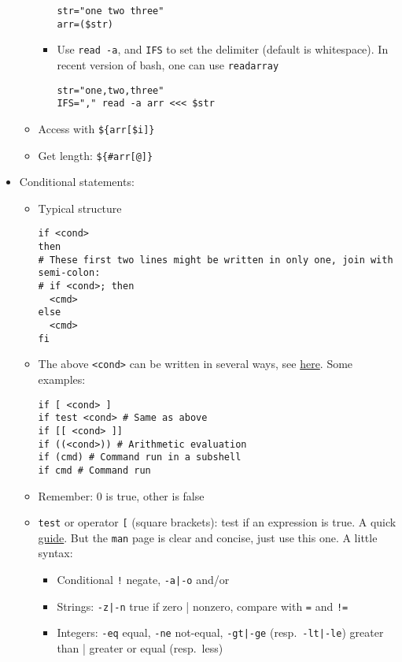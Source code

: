 \documentclass[a4paper,12pt,%
              final%
              ]{article}
\begin{document}
\begin{itemize}
\begin{itemize}
\begin{itemize}
\begin{verbatim}
str="one two three"
arr=($str)
\end{verbatim}
          \item Use \verb|read -a|, and \verb|IFS| to set the delimiter (default is whitespace). In recent version of bash, one can use \verb|readarray|
\begin{verbatim}
str="one,two,three"
IFS="," read -a arr <<< $str
\end{verbatim}
        \end{itemize}
      \item Access with \verb|${arr[$i]}|
      \item Get length: \verb|${#arr[@]}|
    \end{itemize}
  \item Conditional statements:
    \begin{itemize}
      \item Typical structure
\begin{verbatim}
if <cond>
then
# These first two lines might be written in only one, join with semi-colon:
# if <cond>; then
  <cmd>
else
  <cmd>
fi
\end{verbatim}
      \item The above \verb|<cond>| can be written in several ways, see \href{https://unix.stackexchange.com/questions/306111/what-is-the-difference-between-the-bash-operators-vs-vs-vs}{here}. Some examples:
\begin{verbatim}
if [ <cond> ]
if test <cond> # Same as above
if [[ <cond> ]]
if ((<cond>)) # Arithmetic evaluation
if (cmd) # Command run in a subshell
if cmd # Command run
\end{verbatim}
      \item Remember: 0 is true, other is false
      \item \texttt{test} or operator \verb|[| (square brackets): test if an expression is true. A quick \href{https://www.computerhope.com/unix/test.htm}{guide}. But the \texttt{man} page is clear and concise, just use this one. A little syntax:
        \begin{itemize}
          \item Conditional \verb|!| negate, \verb!-a|-o! and/or
          \item Strings: \verb!-z|-n! true if zero | nonzero, compare with \verb|=| and \verb|!=|
          \item Integers: \verb|-eq| equal, \verb|-ne| not-equal, \verb!-gt|-ge! (resp.\ \verb!-lt|-le!) greater than | greater or equal (resp.\ less)

\end{itemize}
\end{itemize}
\end{itemize}
\end{document}
